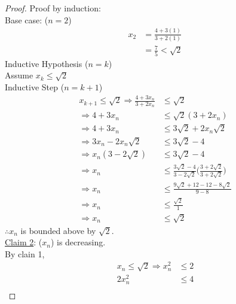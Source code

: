 \documentclass[12pt]{article}
\begin{document}
\begin{enumerate}
\begin{proof}
		      Proof by induction: \\
		      Base case: ($n=2$)
		      \begin{align*}
			      x_2 & = \frac{4+3(1)}{3+2(1)}  \\
			          & = \frac{7}{5} < \sqrt{2}
		      \end{align*}
		      Inductive Hypothesis ($n=k$) \\
		      Assume $x_k \leq \sqrt2$ \\
		      Inductive Step ($n=k+1$)
		      \begin{align*}
			      x_{k+1} \leq \sqrt2 \Rightarrow \frac{4+3x_n}{3+2x_n} & \leq \sqrt2                                                               \\
			      \Rightarrow 4+3x_n                                    & \leq \sqrt2(3+2x_n)                                                       \\
			      \Rightarrow 4+3x_n                                    & \leq 3\sqrt2+2x_n\sqrt2                                                   \\
			      \Rightarrow 3x_n - 2x_n\sqrt2                         & \leq 3\sqrt2 - 4                                                          \\
			      \Rightarrow x_n(3-2\sqrt2)                            & \leq 3\sqrt2-4                                                            \\
			      \Rightarrow x_n                                       & \leq \frac{3\sqrt2-4}{3-2\sqrt2} \bigg(\frac{3+2\sqrt2}{3+2\sqrt2} \bigg) \\
			      \Rightarrow x_n                                       & \leq \frac{9\sqrt2+12-12-8\sqrt2}{9-8}                                    \\
			      \Rightarrow x_n                                       & \leq \frac{\sqrt2}{1}                                                     \\
			      \Rightarrow x_n                                       & \leq \sqrt2
		      \end{align*}
			  $\therefore x_n$ is bounded above by $\sqrt2$. \\
			  \underline{Claim 2}: ($x_n$) is decreasing. \\
			  By clain 1,
			  \begin{align*}
				  x_n \leq \sqrt2 \Rightarrow x_n^2 &\leq 2 \\
				  2x_n^2 &\leq 4 \\

\end{align*}
\end{proof}
\end{enumerate}
\end{document}
